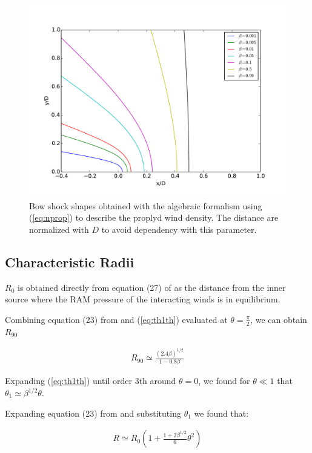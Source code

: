 \begin{figure}
\includegraphics[width=\linewidth]{r-beta}
\caption{Bow shock shapes obtained with the \citep{Canto:1996} algebraic formalism using (\ref{eq:nprop}) to describe the proplyd wind density. The distance are normalized with $D$
to avoid dependency with this parameter.}
\end{figure}

\subsection{Characteristic Radii}

$R_0$ is obtained directly from equation (27) of \citep{Canto:1996} as the distance from the inner source where the RAM pressure of the interacting winds is in equilibrium.

Combining equation (23) from \citep{Canto:1996} and  (\ref{eq:th1th}) evaluated at $\theta=\frac{\pi}{2}$, we can obtain $R_{90}$ 

\begin{align}
R_{90} \simeq \frac{\left(2.4\beta\right)^{1/2}}{1-0.8\beta}
\label{eq:r90}
\end{align}

Expanding (\ref{eq:th1th}) until order 3th around $\theta=0$, we found for $\theta \ll 1$ that $\theta_1\simeq \beta^{1/2}\theta$. 

Expanding equation (23) from \citep{Canto:1996} and substituting $\theta_1$ we found that:

\begin{align}
R \simeq R_0 \left(1+\frac{1+2\beta^{1/2}}{6}\theta^2\right)
\label{eq:R_approx}
\end{align}

